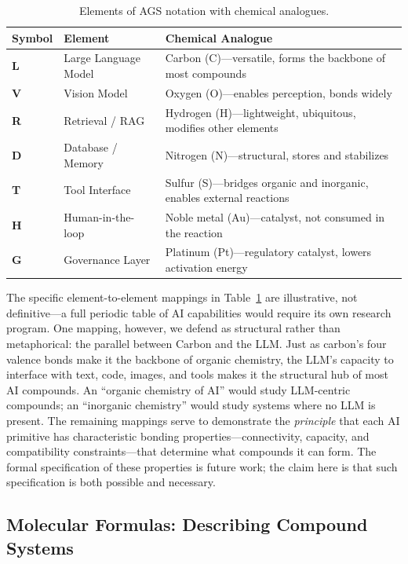 \documentclass[12pt]{article}
\begin{document}
\begin{table}[htbp]
\centering
\begin{tabular}{lll}
\toprule
\textbf{Symbol} & \textbf{Element} & \textbf{Chemical Analogue} \\
\midrule
\textbf{L} & Large Language Model & Carbon (C)---versatile, forms the backbone of most compounds \\
\textbf{V} & Vision Model & Oxygen (O)---enables perception, bonds widely \\
\textbf{R} & Retrieval / RAG & Hydrogen (H)---lightweight, ubiquitous, modifies other elements \\
\textbf{D} & Database / Memory & Nitrogen (N)---structural, stores and stabilizes \\
\textbf{T} & Tool Interface & Sulfur (S)---bridges organic and inorganic, enables external reactions \\
\textbf{H} & Human-in-the-loop & Noble metal (Au)---catalyst, not consumed in the reaction \\
\textbf{G} & Governance Layer & Platinum (Pt)---regulatory catalyst, lowers activation energy \\
\bottomrule
\end{tabular}
\caption{Elements of AGS notation with chemical analogues.}
\label{tab:elements}
\end{table}

The specific element-to-element mappings in Table~\ref{tab:elements} are illustrative, not definitive---a full periodic table of AI capabilities would require its own research program. One mapping, however, we defend as structural rather than metaphorical: the parallel between Carbon and the LLM. Just as carbon's four valence bonds make it the backbone of organic chemistry, the LLM's capacity to interface with text, code, images, and tools makes it the structural hub of most AI compounds. An ``organic chemistry of AI'' would study LLM-centric compounds; an ``inorganic chemistry'' would study systems where no LLM is present. The remaining mappings serve to demonstrate the \emph{principle} that each AI primitive has characteristic bonding properties---connectivity, capacity, and compatibility constraints---that determine what compounds it can form. The formal specification of these properties is future work; the claim here is that such specification is both possible and necessary.

\subsection{Molecular Formulas: Describing Compound Systems}
\label{sec:formulas}
\end{document}
